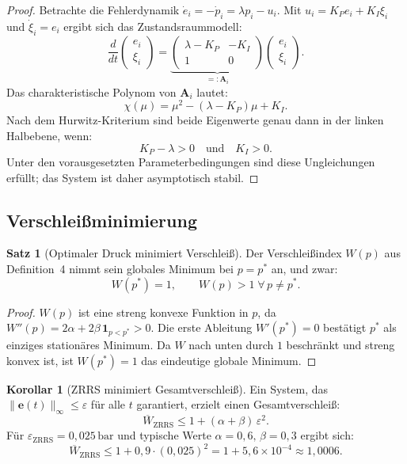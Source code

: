 ﻿\documentclass[a4paper,12pt]{article}
\theoremstyle{definition}
\newtheorem{satz}{Satz}
\newtheorem{korollar}{Korollar}
\begin{document}
\begin{proof}
Betrachte die Fehlerdynamik $\dot{e}_i = -\dot{p}_i = \lambda p_i - u_i$.
Mit $u_i = K_P e_i + K_I \xi_i$ und $\dot{\xi}_i = e_i$ ergibt sich das
Zustandsraummodell:
\[
    \frac{d}{dt}\begin{pmatrix} e_i \\ \xi_i \end{pmatrix}
    = \underbrace{\begin{pmatrix} \lambda - K_P & -K_I \\ 1 & 0 \end{pmatrix}}_{=: \mathbf{A}_i}
    \begin{pmatrix} e_i \\ \xi_i \end{pmatrix}.
\]
Das charakteristische Polynom von $\mathbf{A}_i$ lautet:
\[
    \chi(\mu) = \mu^2 - (\lambda - K_P)\mu + K_I.
\]
Nach dem Hurwitz-Kriterium sind beide Eigenwerte genau dann in der linken
Halbebene, wenn:
\[
    K_P - \lambda > 0 \quad \text{und} \quad K_I > 0.
\]
Unter den vorausgesetzten Parameterbedingungen sind diese Ungleichungen
erfüllt; das System ist daher asymptotisch stabil.
\end{proof}

\subsection{Verschleißminimierung}

\begin{satz}[Optimaler Druck minimiert Verschleiß]
\label{satz:optimaldruck}
Der Verschleißindex $W(p)$ aus Definition~4 nimmt sein globales Minimum bei
$p = p^*$ an, und zwar:
\[
    W(p^*) = 1, \qquad W(p) > 1 \;\forall\, p \neq p^*.
\]
\end{satz}

\begin{proof}
$W(p)$ ist eine streng konvexe Funktion in $p$, da
$W''(p) = 2\alpha + 2\beta\,\mathbf{1}_{p < p^*} > 0$.
Die erste Ableitung $W'(p^*) = 0$ bestätigt $p^*$ als einziges stationäres
Minimum. Da $W$ nach unten durch $1$ beschränkt und streng konvex ist, ist
$W(p^*) = 1$ das eindeutige globale Minimum.
\end{proof}

\begin{korollar}[ZRRS minimiert Gesamtverschleiß]
Ein System, das $\|\mathbf{e}(t)\|_\infty \leq \varepsilon$ für alle $t$ garantiert,
erzielt einen Gesamtverschleiß:
\[
    \overline{W}_{\text{ZRRS}} \leq 1 + (\alpha + \beta)\,\varepsilon^2.
\]
Für $\varepsilon_{\text{ZRRS}} = 0{,}025\,\text{bar}$ und typische Werte
$\alpha = 0{,}6,\, \beta = 0{,}3$ ergibt sich:
\[
    \overline{W}_{\text{ZRRS}} \leq 1 + 0{,}9 \cdot (0{,}025)^2
    = 1 + 5{,}6 \times 10^{-4} \approx 1{,}0006.
\]
\end{korollar}
\end{document}
